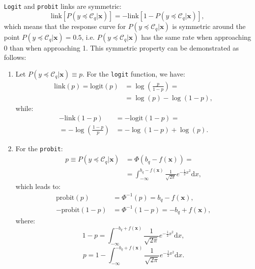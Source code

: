 \documentclass[journal]{IEEEtran}
\begin{document}
	\texttt{Logit} and \texttt{probit} links are symmetric:	
	\begin{equation}
	\text{link}[P(y \preceq \mathcal{C}_q | \mathbf{x})] = -\text{link}[1 - P(y \preceq \mathcal{C}_q | \mathbf{x})],
	\end{equation}
	which means that the response curve for $P(y \preceq \mathcal{C}_q | \mathbf{x})$ is symmetric around the point $P(y \preceq \mathcal{C}_q | \mathbf{x}) = 0.5$, i.e. $P(y \preceq \mathcal{C}_q | \mathbf{x})$ has the same rate when approaching 0 than when approaching 1. This symmetric property can be demonstrated as follows:	
	\begin{enumerate}
		\item Let $P(y \preceq \mathcal{C}_q | \mathbf{x}) \equiv p$. For the \texttt{logit} function, we have:
		\begin{equation}
		\begin{aligned}
		\text{link}(p) = \text{logit}(p) &= \log\left(\frac{p}{1-p}\right) =\\
		&= \log(p) - \log(1-p),
		\end{aligned}
		\end{equation}			
		while:			
		\begin{equation}
		\begin{aligned}
		-\text{link}(1 - p) &= -\text{logit}(1 - p) =\\
		=- \log\left(\frac{1- p}{p}\right) &= - \log(1 - p) + \log(p).
		\end{aligned}
		\end{equation}
		
		\item For the \texttt{probit}:		
		\begin{equation}
		\begin{aligned}
		p \equiv P(y \preceq \mathcal{C}_q | \mathbf{x}) &= \Phi(b_q - f(\mathbf{x})) =\\
		&= \int_{-\infty}^{b_q - f(\mathbf{x})} \frac{1}{\sqrt{2\pi}} e^{-\frac{1}{2}x^2} \mathrm{d}x,
		\end{aligned}
		\end{equation}
		which leads to:
		\begin{align}
		\text{probit}(p) & = \Phi^{-1}(p) = b_q - f(\mathbf{x}),\\
		-\text{probit}(1-p) &= \Phi^{-1}(1-p) = -b_q + f(\mathbf{x}),
		\end{align}
		where:		
		\begin{equation}
		1 - p = \int_{-\infty}^{-b_q + f(\mathbf{x})} \frac{1}{\sqrt{2\pi}} e^{-\frac{1}{2}x^2} \mathrm{d}x,
		\end{equation}
		\begin{equation}
		p = 1 - \int_{-\infty}^{-b_q + f(\mathbf{x})} \frac{1}{\sqrt{2\pi}} e^{-\frac{1}{2}x^2} \mathrm{d}x.
		\end{equation}
	\end{enumerate}
	
\end{document}
